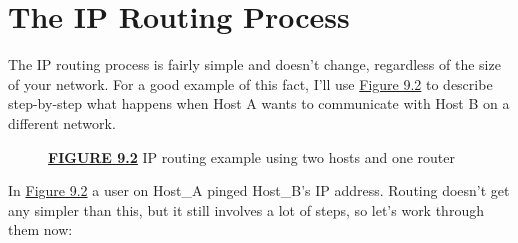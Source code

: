 \section{The IP Routing Process}

The IP routing process is fairly simple and doesn't change, regardless
of the size of your network. For a good example of this fact, I'll use
\protect\hyperlink{c09.xhtmlux5cux23figure9-2}{Figure 9.2} to describe
step-by-step what happens when Host A wants to communicate with Host B
on a different network.

\begin{figure}
\centering
\caption{{\protect\hyperlink{c09.xhtmlux5cux23figureanchor9-2}{\textbf{FIGURE
9.2}} IP routing example using two hosts and one router}}
\end{figure}

\protect\hypertarget{c09.xhtmlux5cux23Page_362}{}{}In
\protect\hyperlink{c09.xhtmlux5cux23figure9-2}{Figure 9.2} a user on
Host\_A pinged Host\_B's IP address. Routing doesn't get any simpler
than this, but it still involves a lot of steps, so let's work through
them now:

